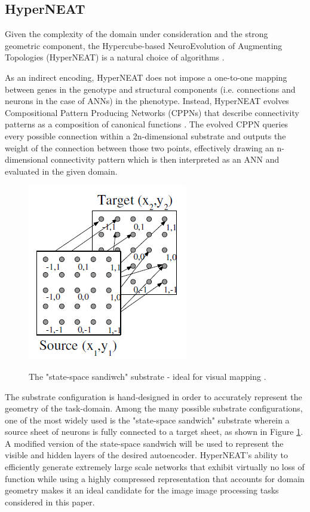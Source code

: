 \documentclass{acm_proc_article-sp}
\begin{document}
\subsection{HyperNEAT}
Given the complexity of the domain under consideration and the strong geometric component, the Hypercube-based NeuroEvolution of Augmenting Topologies (HyperNEAT) is a natural choice of algorithms \cite{Stanley:2009:HEE:1516090.1516093}.

As an indirect encoding, HyperNEAT does not impose a one-to-one mapping between genes in the genotype and structural components (i.e. connections and neurons in the case of ANNs) in the phenotype. Instead, HyperNEAT evolves Compositional Pattern Producing Networks (CPPNs) that describe connectivity patterns as a composition of canonical functions \cite{Stanley:2007:CPP:1265496.1265517, Stanley:2009:HEE:1516090.1516093}.  The evolved CPPN queries every possible connection within a 2n-dimensional substrate and outputs the weight of the connection between those two points, effectively drawing an n-dimensional connectivity pattern which is then interpreted as an ANN and evaluated in the given domain.

\begin{figure}[h]
	\caption{The "state-space sandiwch" substrate - ideal for visual mapping \cite{Stanley:2009:HEE:1516090.1516093}.}
	\centering
	\includegraphics[scale=0.8]{StateSpaceSandwichSubstrate}
	\label{figure:examplesubstrate}
\end{figure}

The substrate configuration is hand-designed in order to accurately represent the geometry of the task-domain.  Among the many possible substrate configurations, one of the most widely used is the "state-space sandwich" substrate wherein a source sheet of neurons is fully connected to a target sheet, as shown in Figure \ref{figure:examplesubstrate}.  A modified version of the state-space sandwich will be used to represent the visible and hidden layers of the desired autoencoder.  HyperNEAT's ability to efficiently generate extremely large scale networks that exhibit virtually no loss of function while using a highly compressed representation that accounts for domain geometry makes it an ideal candidate for the image image processing tasks considered in this paper.
\end{document}
